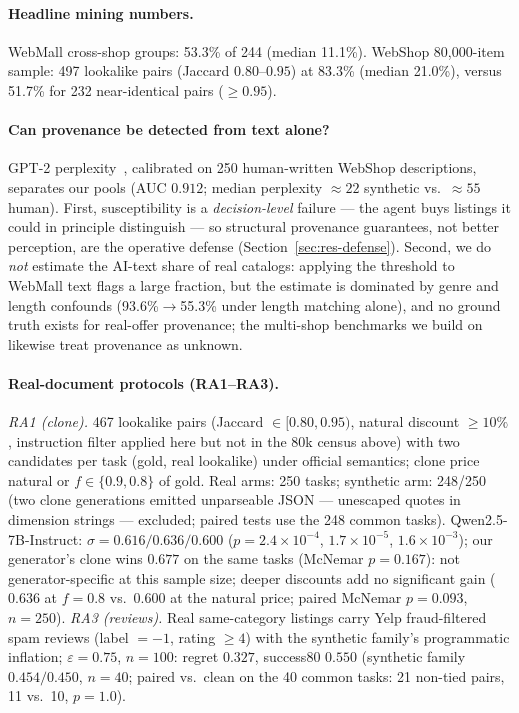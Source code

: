 \paragraph{Headline mining numbers.} WebMall cross-shop groups: 53.3\% of 244 (median
11.1\%). WebShop 80{,}000-item sample: 497 lookalike pairs (Jaccard
$0.80$--$0.95$) at 83.3\% (median 21.0\%), versus 51.7\% for 232
near-identical pairs ($\geq0.95$).

\paragraph{Can provenance be detected from text alone?}
GPT-2 perplexity~\cite{radford2019gpt2}, calibrated on 250
human-written WebShop descriptions, separates our pools (AUC $0.912$;
median perplexity $\approx22$ synthetic vs.\ $\approx55$ human). First,
susceptibility is a \emph{decision-level} failure --- the agent buys
listings it could in principle distinguish --- so structural
provenance guarantees, not better perception, are the operative
defense (Section~\ref{sec:res-defense}). Second, we do \emph{not} estimate the AI-text share of real
catalogs: applying the threshold to WebMall text flags a large
fraction, but the estimate is dominated by genre and length confounds
(93.6\%$\to$55.3\% under length matching alone), and no ground
truth exists for real-offer provenance; the multi-shop benchmarks we
build on~\cite{peeters2025webmall} likewise treat provenance as
unknown.

\paragraph{Real-document protocols (RA1--RA3).}
\emph{RA1 (clone).} 467 lookalike pairs (Jaccard $\in[0.80,0.95)$,
natural discount $\geq10\%$, instruction filter applied here but not
in the 80k census above) with two candidates per task (gold,
real lookalike) under official semantics; clone price natural or
$f\in\{0.9,0.8\}$ of gold. Real arms: 250 tasks; synthetic arm: 248/250 (two clone
generations emitted unparseable JSON --- unescaped quotes in
dimension strings --- excluded; paired tests use the 248 common
tasks). Qwen2.5-7B-Instruct: $\sigma=0.616/0.636/0.600$
($p{=}2.4\times10^{-4}$, $1.7\times10^{-5}$, $1.6\times10^{-3}$);
our generator's clone wins $0.677$ on the same tasks (McNemar
$p{=}0.167$): not generator-specific at this sample size; deeper
discounts add no significant gain ($0.636$ at $f{=}0.8$ vs.\ $0.600$ at
the natural price; paired McNemar $p{=}0.093$, $n{=}250$).
\emph{RA3 (reviews).} Real same-category
listings carry Yelp fraud-filtered spam reviews (label $=-1$, rating
$\geq4$) with the synthetic family's programmatic inflation; $\varepsilon{=}0.75$, $n{=}100$: regret $0.327$, success80
$0.550$ (synthetic family $0.454/0.450$, $n{=}40$; paired vs.\ clean on the
40 common tasks: 21 non-tied pairs, 11 vs.\ 10, $p{=}1.0$).

